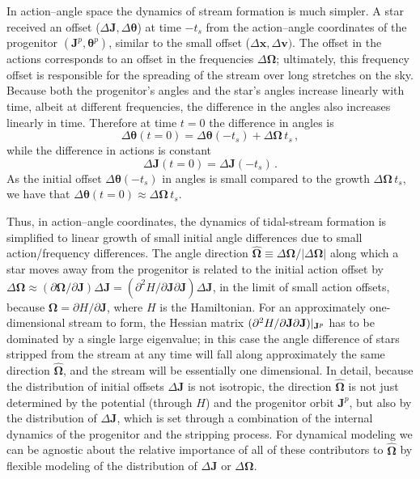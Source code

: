 \documentclass[12pt,preprint]{aastex}
\renewcommand{\vec}[1]{\ensuremath{\mathbf{#1}}}
\newcommand{\unitvec}[1]{\ensuremath{\mathbf{\hat{#1}}}}
\newcommand{\vecx}{\ensuremath{\vec{x}}}
\newcommand{\vecv}{\ensuremath{\vec{v}}}
\newcommand{\vecj}{\ensuremath{\vec{J}}}
\newcommand{\veco}{\ensuremath{\vec{\Omega}}}
\newcommand{\veca}{\ensuremath{\boldsymbol\theta}}
\newcommand{\ts}{\ensuremath{t_s}}
\begin{document}
In action--angle space the dynamics of stream formation is much
simpler. A star received an offset ($\Delta \vecj,\Delta \veca$) at
time $-\ts$ from the action--angle coordinates of the progenitor
$(\vecj^p,\veca^p)$, similar to the small offset ($\Delta \vecx,\Delta
\vecv)$. The offset in the actions corresponds to an offset in the
frequencies $\Delta \veco$; ultimately, this frequency offset is
responsible for the spreading of the stream over long stretches on the
sky. Because both the progenitor's angles and the star's angles
increase linearly with time, albeit at different frequencies, the
difference in the angles also increases linearly in time. Therefore at
time $t=0$ the difference in angles is
\begin{equation}
\Delta \veca(t=0) = \Delta \veca(-\ts) + \Delta \veco \,\ts\,,
\end{equation}
while the difference in actions is constant
\begin{equation}
\Delta \vecj(t=0) = \Delta \vecj(-\ts)\,.
\end{equation}
As the initial offset $\Delta \veca(-\ts)$ in angles is small compared
to the growth $\Delta \veco \,\ts$, we have that $\Delta \veca(t=0)
\approx \Delta \veco \,\ts$.

Thus, in action--angle coordinates, the dynamics of tidal-stream
formation is simplified to linear growth of small initial angle
differences due to small action/frequency differences. The angle
direction $\unitvec{\veco} \equiv \Delta \veco / | \Delta \veco|$
along which a star moves away from the progenitor is related to the
initial action offset by $\Delta \veco \approx (\partial \veco /
\partial \vecj) \Delta \vecj = (\partial^2 H / \partial \vecj \partial
\vecj) \Delta \vecj$, in the limit of small action offsets, because
$\veco = \partial H / \partial \vecj$, where $H$ is the
Hamiltonian. For an approximately one-dimensional stream to form, the
Hessian matrix $(\partial^2 H / \partial \vecj \partial
\vecj)\large|_{\vecj^p}$ has to be dominated by a single large
eigenvalue; in this case the angle difference of stars stripped from
the stream at any time will fall along approximately the same
direction $\unitvec\veco$, and the stream will be essentially one
dimensional. In detail, because the distribution of initial offsets
$\Delta \vecj$ is not isotropic, the direction $\unitvec \veco$ is not
just determined by the potential (through $H$) and the progenitor
orbit $\vecj^p$, but also by the distribution of $\Delta \vecj$, which
is set through a combination of the internal dynamics of the
progenitor and the stripping process. For dynamical modeling we can be
agnostic about the relative importance of all of these contributors to
$\unitvec \veco$ by flexible modeling of the distribution of $\Delta
\vecj$ or $\Delta \veco$.
\end{document}
